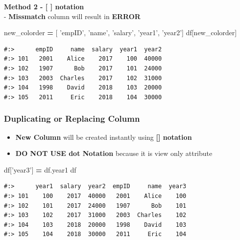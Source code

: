\documentclass[
]{book}
\newenvironment{Shaded}{\begin{snugshade}}{\end{snugshade}}
\newcommand{\NormalTok}[1]{#1}
\newcommand{\OperatorTok}[1]{\textcolor[rgb]{0.43,0.43,0.43}{\textbf{#1}}}
\newcommand{\StringTok}[1]{\textcolor[rgb]{0.5,0.5,0.5}{#1}}
\providecommand{\tightlist}{%
  \setlength{\itemsep}{0pt}\setlength{\parskip}{0pt}}
\begin{document}
\textbf{Method 2 - {[} {]} notation}\\
- \textbf{Missmatch} column will result in \textbf{ERROR}

\begin{Shaded}
\begin{Highlighting}[]
\NormalTok{new_colorder }\OperatorTok{=}\NormalTok{ [ }\StringTok{'empID'}\NormalTok{, }\StringTok{'name'}\NormalTok{, }\StringTok{'salary'}\NormalTok{, }\StringTok{'year1'}\NormalTok{, }\StringTok{'year2'}\NormalTok{]}
\NormalTok{df[new_colorder]}
\end{Highlighting}
\end{Shaded}

\begin{verbatim}
#:>      empID     name  salary  year1  year2
#:> 101   2001    Alice    2017    100  40000
#:> 102   1907      Bob    2017    101  24000
#:> 103   2003  Charles    2017    102  31000
#:> 104   1998    David    2018    103  20000
#:> 105   2011     Eric    2018    104  30000
\end{verbatim}

\hypertarget{duplicating-or-replacing-column}{%
\subsubsection{Duplicating or Replacing Column}\label{duplicating-or-replacing-column}}

\begin{itemize}
\tightlist
\item
  \textbf{New Column} will be created instantly using \textbf{{[}{]} notation}\\
\item
  \textbf{DO NOT USE dot Notation} because it is view only attribute
\end{itemize}

\begin{Shaded}
\begin{Highlighting}[]
\NormalTok{df[}\StringTok{'year3'}\NormalTok{] }\OperatorTok{=}\NormalTok{ df.year1}
\NormalTok{df}
\end{Highlighting}
\end{Shaded}

\begin{verbatim}
#:>      year1  salary  year2  empID     name  year3
#:> 101    100    2017  40000   2001    Alice    100
#:> 102    101    2017  24000   1907      Bob    101
#:> 103    102    2017  31000   2003  Charles    102
#:> 104    103    2018  20000   1998    David    103
#:> 105    104    2018  30000   2011     Eric    104
\end{verbatim}
\end{document}
